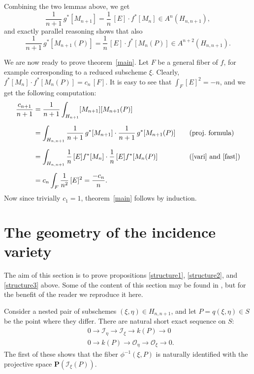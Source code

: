 \documentclass[12pt]{amsart}
\def\Hnn{H_{n,n+1}}
\def\Hnp{H_{n+1}}
\def\i{^{-1}}
\def\PP{{\mathbf P}}
\def\I{{\mathcal I}}
\def\OO{{\mathcal O}}
\theoremstyle{definition}
\theoremstyle{remark}
\numberwithin{equation}{section}
\newcommand{\thmref}[1]{theorem~\ref{#1}}
\begin{document}
Combining the two lemmas above, we get
\begin{equation}
  \label{vari}
  \frac1{n+1}\,g^*[M_{n+1}] = \frac1n\,[E]\cdot f^*[M_n] \in A^n(\Hnn),
\end{equation}
and exactly parallel reasoning shows that also
\begin{equation}
  \label{fast}
    \frac1{n+1}\,g^*[M_{n+1}(P)] = \frac1n\,[E]\cdot f^*[M_n(P)] \in
    A^{n+2} (\Hnn).
\end{equation}

We are now ready to prove \thmref{main}. Let $F$ be a general
fiber of $f$, for example corresponding to a reduced subscheme
$\xi$. Clearly, $f^*[M_n]\cdot f^*[M_n(P)] = c_n\,[F]$.
It is easy to see that $\int_F [E]^2 = -n$, and we get the
following computation:
\begin{alignat*}{3}
  \frac{c_{n+1}}{n+1} &= \frac{1}{n+1}\int_{\Hnp}
  [M_{n+1}][M_{n+1}(P)]&&\\[2mm]
  & =\int_{\Hnn}
  \frac1{n+1}\,{g^*[M_{n+1}]}\cdot\frac1{n+1}\,{g^*[M_{n+1}(P)]}&\quad
  &\text{(proj.\ formula)}\\[2mm]
  & = \int_{\Hnn} \frac1n\,{[E]f^*[M_n]}
  \cdot \frac1n\,{[E]f^*[M_n(P)]} &\quad&\text{(\eqref{vari} and
    \eqref{fast})}\\[2mm]
  &=c_n \int_F \frac1{n^2} \,[E]^2 =\frac{-c_n}n.
\end{alignat*}
Now since trivially $c_1=1$, \thmref{main} follows by induction.

\section{The geometry of the incidence variety}

The aim of this section is to prove propositions \ref{structure1},
\ref{structure2}, and \ref{structure3} above.  Some of the content
of this section may be found in \cite{Ell}, but for the benefit of
the reader we reproduce it here.

Consider a nested pair of subschemes $(\xi,\eta)\in\Hnn$, and let
$P=q(\xi,\eta)\in S$ be the point where they differ. There are
natural short exact sequence on $S$:
\begin{align}\label{basic0}
  &0 \to \I_{\eta} \to \I_{\xi} \to k(P) \to 0\\
  \label{basic1}
  &0 \to k(P) \to \OO_{\eta} \to \OO_{\xi} \to 0.
\end{align}
The first of these shows that the fiber $\phi\i(\xi,P)$ is
naturally identified with
the projective space $\PP(\I_{\xi}(P))$.
\end{document}
